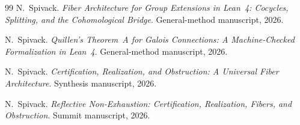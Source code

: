 \documentclass[11pt]{article}
\begin{document}
\begin{thebibliography}{99}
N.~Spivack.
\newblock \emph{Fiber Architecture for Group Extensions in Lean~4: Cocycles, Splitting, and the Cohomological Bridge}.
\newblock General-method manuscript, 2026.

N.~Spivack.
\newblock \emph{Quillen's Theorem~A for Galois Connections: A Machine-Checked Formalization in Lean~4}.
\newblock General-method manuscript, 2026.

N.~Spivack.
\newblock \emph{Certification, Realization, and Obstruction: A Universal Fiber Architecture}.
\newblock Synthesis manuscript, 2026.

N.~Spivack.
\newblock \emph{Reflective Non-Exhaustion: Certification, Realization, Fibers, and Obstruction}.
\newblock Summit manuscript, 2026.

\end{thebibliography}
\end{document}

